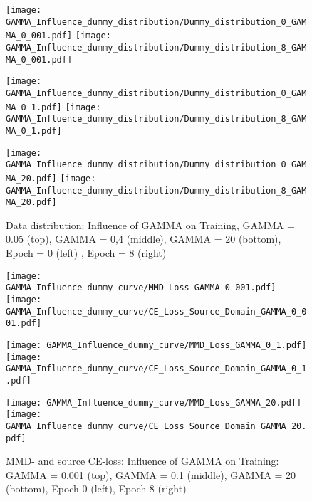 \begin{figure}[htp]
  \centering
  \texttt{[image: GAMMA\_Influence\_dummy\_distribution/Dummy\_distribution\_0\_GAMMA\_0\_001.pdf]}
  \hspace{.4cm}
  \texttt{[image: GAMMA\_Influence\_dummy\_distribution/Dummy\_distribution\_8\_GAMMA\_0\_001.pdf]}

  \vspace{.1cm}

  \texttt{[image: GAMMA\_Influence\_dummy\_distribution/Dummy\_distribution\_0\_GAMMA\_0\_1.pdf]}
  \hspace{.4cm}
  \texttt{[image: GAMMA\_Influence\_dummy\_distribution/Dummy\_distribution\_8\_GAMMA\_0\_1.pdf]}

  \vspace{.1cm}

  \texttt{[image: GAMMA\_Influence\_dummy\_distribution/Dummy\_distribution\_0\_GAMMA\_20.pdf]}
  \hspace{.4cm}
  \texttt{[image: GAMMA\_Influence\_dummy\_distribution/Dummy\_distribution\_8\_GAMMA\_20.pdf]}
 

  \caption{Data distribution: Influence of GAMMA on Training, GAMMA = 0.05 (top), GAMMA = 0,4 (middle), GAMMA = 20 (bottom), Epoch = 0 (left) , Epoch = 8 (right)}
  \label{fig:point_cloud_mmd}
\end{figure}


\begin{figure}[htp]
  \centering
  \texttt{[image: GAMMA\_Influence\_dummy\_curve/MMD\_Loss\_GAMMA\_0\_001.pdf]}
  \hspace{.3cm}
  \texttt{[image: GAMMA\_Influence\_dummy\_curve/CE\_Loss\_Source\_Domain\_GAMMA\_0\_001.pdf]}

  \vspace{.1cm}

  \texttt{[image: GAMMA\_Influence\_dummy\_curve/MMD\_Loss\_GAMMA\_0\_1.pdf]}
  \hspace{.3cm}
  \texttt{[image: GAMMA\_Influence\_dummy\_curve/CE\_Loss\_Source\_Domain\_GAMMA\_0\_1.pdf]}

  \vspace{.1cm}

  \texttt{[image: GAMMA\_Influence\_dummy\_curve/MMD\_Loss\_GAMMA\_20.pdf]}
  \hspace{.1cm}
  \texttt{[image: GAMMA\_Influence\_dummy\_curve/CE\_Loss\_Source\_Domain\_GAMMA\_20.pdf]}

  \caption{MMD- and source CE-loss: Influence of GAMMA on Training: GAMMA = 0.001 (top), GAMMA = 0.1 (middle), GAMMA = 20 (bottom), Epoch 0 (left), Epoch 8 (right)}
  \label{fig:learning_curves_influence_mmd_feature_extractor}
\end{figure}

